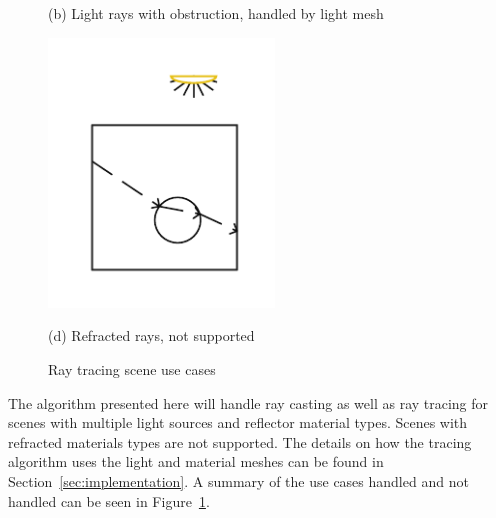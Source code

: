\begin{figure}[!htb]
  (b) Light rays with obstruction, handled by light mesh
  
  \includegraphics[width=6cm]{drawings/Case_4.pdf}
  
  (d) Refracted rays, not supported
  
\endminipage
\caption{Ray tracing scene use cases}
\label{fig:use-cases}
\end{figure}


The algorithm presented here will handle ray casting as well as ray tracing for
scenes with multiple light sources and reflector material types.  Scenes with
refracted materials types are not supported.  The details on how the tracing
algorithm uses the light and material meshes can be found in 
Section~\ref{sec:implementation}.  A summary of the use cases handled and not 
handled can be seen in Figure~\ref{fig:use-cases}.

















